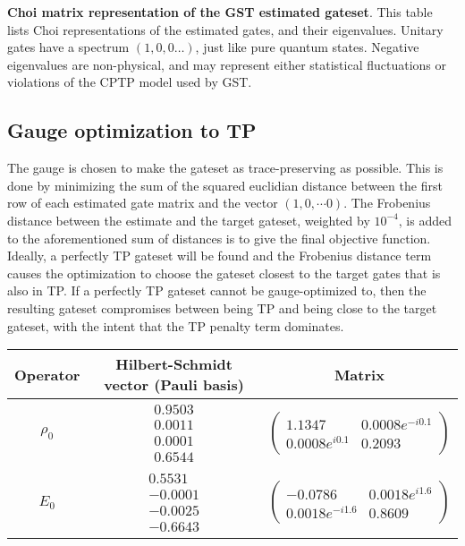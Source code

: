 {\begin{table}[h]
\begin{center}
\caption{\textbf{Choi matrix representation of the GST estimated gateset}.  This table lists Choi representations of the estimated gates, and their eigenvalues.  Unitary gates have a spectrum $(1,0,0\ldots)$, just like pure quantum states.  Negative eigenvalues are non-physical, and may represent either statistical fluctuations or violations of the CPTP model used by GST.\label{bestTargetGatesGatesetChoiTable}}
\end{center}
\end{table}

\clearpage

\subsection{Gauge optimization to TP}
The gauge is chosen to make the gateset as trace-preserving as possible.  This is done by minimizing the sum of the squared euclidian distance between the first row of each estimated gate matrix and the vector $(1,0,\cdots 0)$.  The Frobenius distance between the estimate and the target gateset, weighted by $10^{-4}$, is added to the aforementioned sum of distances is to give the final objective function.  Ideally, a perfectly TP gateset will be found and the Frobenius distance term causes the optimization to choose the gateset closest to the target gates that is also in TP.  If a perfectly TP gateset cannot be gauge-optimized to, then the resulting gateset compromises between being TP and being close to the target gateset, with the intent that the TP penalty term dominates.

\begin{table}[h]
\begin{center}
\begin{tabular}[l]{|c|c|c|}
\hline
Operator & Hilbert-Schmidt vector (Pauli basis) & Matrix \\ \hline
$\rho_{0}$ & $ \begin{array}{c}
0.9503 \\ 
0.0011 \\ 
0.0001 \\ 
0.6544
 \end{array} $
 & $ \left(\!\!\begin{array}{cc}
1.1347 & 0.0008e^{-i0.1} \\ 
0.0008e^{i0.1} & 0.2093
 \end{array}\!\!\right) $
 \\ \hline
$E_{0}$ & $ \begin{array}{c}
0.5531 \\ 
-0.0001 \\ 
-0.0025 \\ 
-0.6643
 \end{array} $
 & $ \left(\!\!\begin{array}{cc}
-0.0786 & 0.0018e^{i1.6} \\ 
0.0018e^{-i1.6} & 0.8609
 \end{array}\!\!\right) $
 \\ \hline
\end{tabular}


\end{center}
\end{table}}
